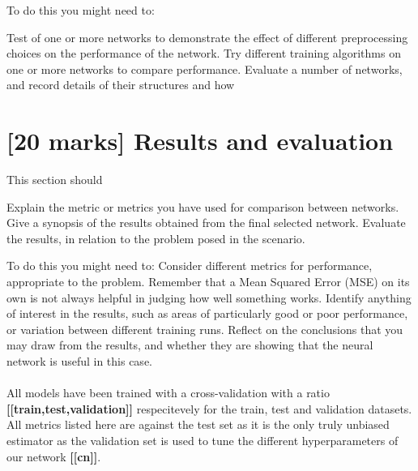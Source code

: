 \documentclass[11pt,a4paper]{article}
\begin{document}
To do this you might need to:
\begin{outline}
  \1 Test of one or more networks to demonstrate the effect of different preprocessing choices on the performance of the network.
  \1 Try different training algorithms on one or more networks to compare performance.
  \1 Evaluate a number of networks, and record details of their structures and how
\end{outline}

\section{[20 marks] Results and evaluation}
This section should
\begin{outline}
  \1 Explain the metric or metrics you have used for comparison between networks.
  \1 Give a synopsis of the results obtained from the final selected network.
  \1 Evaluate the results, in relation to the problem posed in the scenario. 
\end{outline}
\begin{outline}
To do this you might need to:
  \1 Consider different metrics for performance, appropriate to the problem. Remember that a Mean Squared Error (MSE) on its own is not always helpful in judging how well something works.
  \1 Identify anything of interest in the results, such as areas of particularly good or poor performance, or variation between different training runs.
  \1 Reflect on the conclusions that you may draw from the results, and whether they are showing that the neural network is useful in this case.
\end{outline}

\paragraph{}
All models have been trained with a cross-validation with a ratio \textbf{[[train,test,validation]]} respecitevely for the train, test and validation datasets. All metrics listed here are against the test set as it is the only truly unbiased estimator as the validation set is used to tune the different hyperparameters of our network \textbf{[[cn]]}. 
\end{document}
